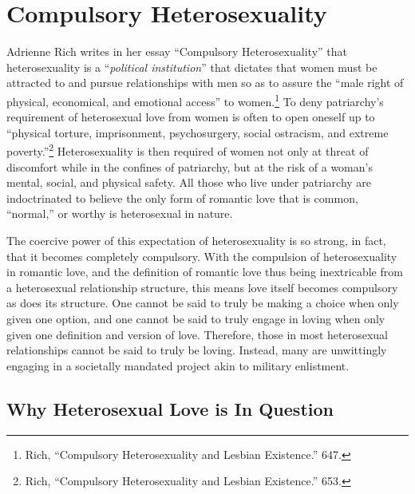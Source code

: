 \section{Compulsory Heterosexuality}

Adrienne Rich writes in her essay ``Compulsory Heterosexuality'' that
heterosexuality is a ``\emph{political institution}'' that dictates that
women must be attracted to and pursue relationships with men so as to
assure the ``male right of physical, economical, and emotional access''
to women.\footnote{Rich, ``Compulsory Heterosexuality and Lesbian
  Existence.'' 647.} To deny patriarchy's requirement of heterosexual
love from women is often to open oneself up to ``physical torture,
imprisonment, psychosurgery, social ostracism, and extreme
poverty.''\footnote{Rich, ``Compulsory Heterosexuality and Lesbian
  Existence.'' 653.} Heterosexuality is then required of
women not only at threat of discomfort while in the confines of
patriarchy, but at the risk of a woman's mental, social, and physical
safety. All those who live under patriarchy are indoctrinated to believe
the only form of romantic love that is common, ``normal,'' or worthy is
heterosexual in nature.

The coercive power of this expectation of heterosexuality is so strong,
in fact, that it becomes completely compulsory. With the compulsion of
heterosexuality in romantic love, and the definition of romantic love
thus being inextricable from a heterosexual relationship structure, this
means love itself becomes compulsory as does its structure. One cannot
be said to truly be making a choice when only given one option, and one
cannot be said to truly engage in loving when only given one definition
and version of love. Therefore, those in most heterosexual relationships
cannot be said to truly be loving. Instead, many are unwittingly
engaging in a societally mandated project akin to military enlistment.

\subsection{Why Heterosexual Love is In Question}

